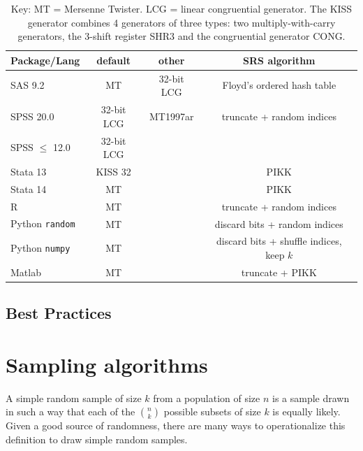 \documentclass[12pt]{article}
\newcommand{\todo}[1]{{\color{red}{TO DO: \sc #1}}}
\begin{document}
\begin{table}[h]
\caption{Key: MT = Mersenne Twister. LCG = linear congruential generator. The KISS generator combines 4 generators of three types: two multiply-with-carry generators, the 3-shift register SHR3 and the congruential generator CONG. }
\begin{center}
\begin{tabular}{l|c|c|c|}
Package/Lang & default & other & SRS algorithm \\
\hline
SAS 9.2 & MT & 32-bit LCG & Floyd's ordered hash table \\ %
SPSS 20.0 & 32-bit LCG & MT1997ar & truncate + random indices \\ %
SPSS $\leq$ 12.0 & 32-bit LCG & & \\
Stata 13 & KISS 32 & & PIKK \\
Stata 14 & MT & & PIKK \\
R & MT & & truncate + random indices \\
Python \texttt{random} & MT & & discard bits + random indices \\
Python \texttt{numpy} & MT & & discard bits + shuffle indices, keep $k$ \\
Matlab & MT & & truncate + PIKK
\end{tabular}
\end{center}
\label{tab:software}
\end{table}%



\subsection{Best Practices}

\todo{}




\appendix


\section{Sampling algorithms}\label{sec:algorithms}
A simple random sample of size $k$ from a population of size $n$ is a sample drawn in such a way that each of the ${n \choose k}$ possible subsets of size $k$ is equally likely.
Given a good source of randomness, there are many ways to operationalize this definition to draw simple random samples.
\end{document}
